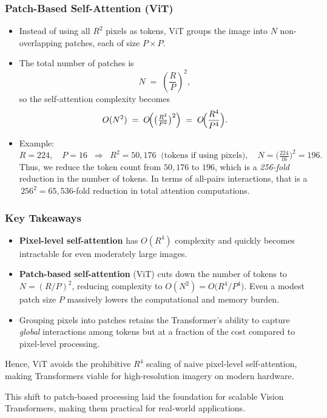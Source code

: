 \subsubsection{Patch-Based Self-Attention (ViT)}
\begin{itemize}
    \item Instead of using all \(R^2\) pixels as tokens, ViT groups the image into \(N\) non-overlapping patches, each of size \(P \times P\).  
    \item The total number of patches is
    \[
    N \;=\; \left(\frac{R}{P}\right)^2,
    \]
    so the self-attention complexity becomes
    \[
    O(N^2) \;=\; O\!\Bigl(\bigl(\tfrac{R^2}{P^2}\bigr)^2\Bigr) \;=\; O\!\Bigl(\frac{R^4}{P^4}\Bigr).
    \]
    \item Example: 
    \[
    R = 224,\quad P = 16 \;\;\Longrightarrow\;\; 
    R^2 = 50{,}176\;\;\text{(tokens if using pixels)},
    \quad
    N = \bigl(\tfrac{224}{16}\bigr)^2 = 196.
    \]
    Thus, we reduce the token count from \(50{,}176\) to \(196\), which is a \emph{256-fold} reduction in the number of tokens. In terms of all-pairs interactions, that is a \(\,256^2\!=\!65{,}536\)-fold reduction in total attention computations.
\end{itemize}

\subsubsection{Key Takeaways}
\begin{itemize}
    \item \textbf{Pixel-level self-attention} has \(O(R^4)\) complexity and quickly becomes intractable for even moderately large images.
    \item \textbf{Patch-based self-attention} (ViT) cuts down the number of tokens to \(N = (R/P)^2\), reducing complexity to \(O(N^2)\!=\!O\bigl(R^4/P^4\bigr)\). Even a modest patch size \(P\) massively lowers the computational and memory burden.
    \item Grouping pixels into patches retains the Transformer’s ability to capture \emph{global} interactions among tokens but at a fraction of the cost compared to pixel-level processing.
\end{itemize}

Hence, ViT avoids the prohibitive \(R^4\) scaling of naive pixel-level self-attention, making Transformers viable for high-resolution imagery on modern hardware.

\noindent
This shift to patch-based processing laid the foundation for scalable Vision Transformers, making them practical for real-world applications.

